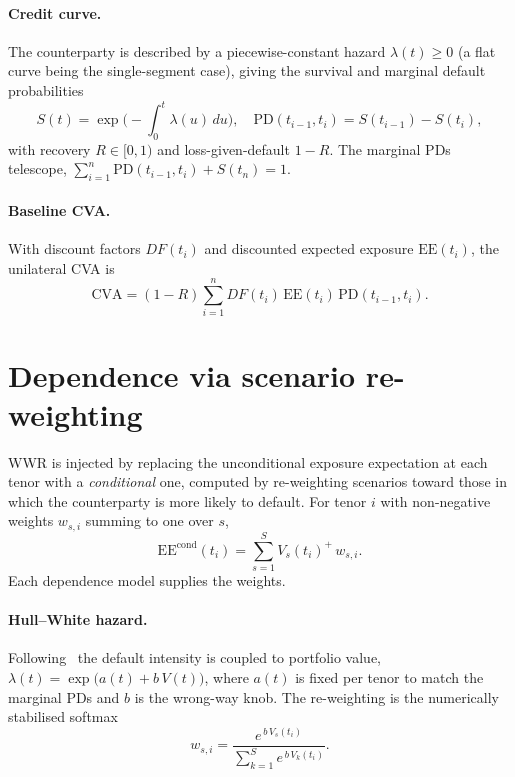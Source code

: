 \documentclass[12pt]{article}
\newcommand{\PD}{\mathrm{PD}}
\newcommand{\EE}{\mathrm{EE}}
\newcommand{\CVA}{\mathrm{CVA}}
\begin{document}
\paragraph{Credit curve.} The counterparty is described by a piecewise-constant
hazard $\lambda(t)\ge 0$ (a flat curve being the single-segment case), giving
the survival and marginal default probabilities
\begin{equation}
S(t)=\exp\!\Big(-\!\int_0^t\!\lambda(u)\,du\Big),\quad
\PD(t_{i-1},t_i)=S(t_{i-1})-S(t_i),
\end{equation}
with recovery $R\in[0,1)$ and loss-given-default $1-R$. The marginal PDs
telescope, $\sum_{i=1}^{n}\PD(t_{i-1},t_i)+S(t_n)=1$.

\paragraph{Baseline CVA.} With discount factors $DF(t_i)$ and discounted
expected exposure $\EE(t_i)$, the unilateral CVA is
\begin{equation}\label{eq:cva}
\CVA=(1-R)\sum_{i=1}^{n}DF(t_i)\,\EE(t_i)\,\PD(t_{i-1},t_i).
\end{equation}

\section{Dependence via scenario re-weighting}\label{sec:dep}
WWR is injected by replacing the unconditional exposure expectation at each
tenor with a \emph{conditional} one, computed by re-weighting scenarios toward
those in which the counterparty is more likely to default. For tenor $i$ with
non-negative weights $w_{s,i}$ summing to one over $s$,
\begin{equation}\label{eq:condee}
\EE^{\mathrm{cond}}(t_i)=\sum_{s=1}^{S} V_s(t_i)^{+}\,w_{s,i}.
\end{equation}
Each dependence model supplies the weights.

\paragraph{Hull--White hazard.} Following~\citet{hullwhite2012} the default
intensity is coupled to portfolio value,
$\lambda(t)=\exp\!\big(a(t)+b\,V(t)\big)$, where $a(t)$ is fixed per tenor to
match the marginal PDs and $b$ is the wrong-way knob. The re-weighting is the
numerically stabilised softmax
\begin{equation}\label{eq:hwweights}
w_{s,i}=\frac{e^{\,b\,V_s(t_i)}}{\sum_{k=1}^{S} e^{\,b\,V_k(t_i)}}.
\end{equation}
\end{document}
